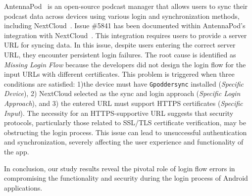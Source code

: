 AntennaPod~\cite{AntennaPod} is an open-source podcast manager that allows users to sync their podcast data across devices using various login and synchronization methods, including NextCloud~\cite{nextcloud-android}. 
Issue \#5841 has been documented within AntennaPod's integration with NextCloud~\cite{AntennaPodissue}. 
This integration requires users to provide a server URL for syncing data.
In this issue, despite users entering the correct server URL, they encounter persistent login failures. The root cause is identified as \textit{Missing Login Flow} because the developers did not design the login flow for the input URLs with different certificates.  
This problem is triggered when three conditions are satisfied: 1)the device must have \texttt{Gpoddersync} installed (\textit{Specific Device}), 2) NextCloud selected as the sync and login approach (\textit{Specific Login Approach}), and 3) the entered URL must support HTTPS certificates (\textit{Specific Input}). The necessity for an HTTPS-supportive URL suggests that security protocols, particularly those related to SSL/TLS certificate verification, may be obstructing the login process. This issue can lead to unsuccessful authentication and synchronization, severely affecting the user experience and functionality of the app.

In conclusion, our study results reveal the pivotal role of login flow errors in compromising the functionality and security during the login process of Android applications. %
